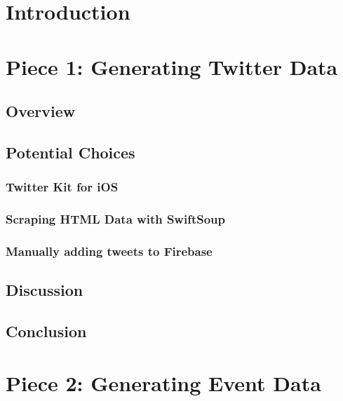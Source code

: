 \documentclass[onecolumn, draftclsnofoot,10pt, compsoc]{IEEEtran}
\begin{document}
\begin{titlepage}
\begin{singlespace}
\begin{abstract}
        \end{abstract}     
    \end{singlespace}
\end{titlepage}
\newpage
{}
\tableofcontents
\clearpage

\section{Introduction}
\section{Piece 1: Generating Twitter Data}
\subsection{Overview}
\subsection{Potential Choices}
\subsubsection{Twitter Kit for iOS\cite{twitter}}
\subsubsection{Scraping HTML Data with SwiftSoup\cite{ssoup}}
\subsubsection{Manually adding tweets to Firebase\cite{fb}}
\subsection{Discussion}
\subsection{Conclusion}

\section{Piece 2: Generating Event Data}
\end{document}
